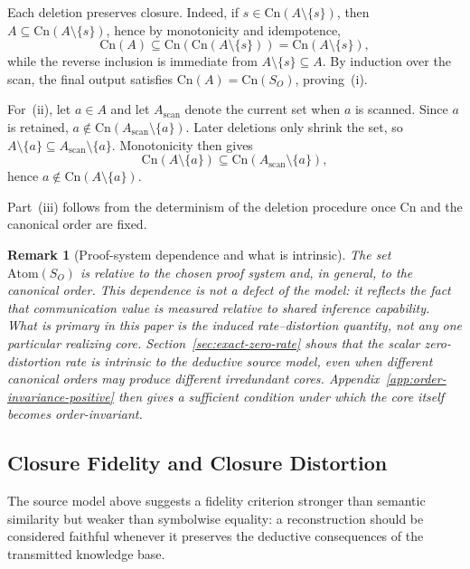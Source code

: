 \documentclass[journal,onecolumn]{IEEEtran}
\makeatletter
\newcommand{\Atom}{\text{Atom}}
\newcommand{\Cn}{\text{Cn}}
\newtheorem{remark}{Remark}[section]
\numberwithin{equation}{section}
\renewenvironment{proof}[1][\proofname]{\par
  \pushQED{\qed}%
  \normalfont \topsep6\p@\@plus6\p@\relax
  \trivlist
  \item[\hskip\labelsep
        \itshape
    #1\@addpunct{.}]\ignorespaces
}{%
  \popQED\endtrivlist\@endpefalse
}
\makeatother
\begin{document}
\begin{proof}
Each deletion preserves closure.
Indeed, if \(s\in\Cn(A\setminus\{s\})\), then
\(A\subseteq\Cn(A\setminus\{s\})\), hence by monotonicity and
idempotence,
\[
  \Cn(A)\subseteq\Cn(\Cn(A\setminus\{s\}))
  =\Cn(A\setminus\{s\}),
\]
while the reverse inclusion is immediate from
\(A\setminus\{s\}\subseteq A\).
By induction over the scan, the final output satisfies
\(\Cn(A)=\Cn(S_O)\), proving~\textup{(i)}.

For~\textup{(ii)}, let \(a\in A\) and let
\(A_{\mathrm{scan}}\) denote the current set when \(a\) is scanned.
Since \(a\) is retained,
\(a\notin\Cn(A_{\mathrm{scan}}\setminus\{a\})\).
Later deletions only shrink the set, so
\(A\setminus\{a\}\subseteq A_{\mathrm{scan}}\setminus\{a\}\).
Monotonicity then gives
\[
  \Cn(A\setminus\{a\})
  \subseteq
  \Cn(A_{\mathrm{scan}}\setminus\{a\}),
\]
hence \(a\notin\Cn(A\setminus\{a\})\).

Part~\textup{(iii)} follows from the determinism of the deletion
procedure once \(\Cn\) and the canonical order are fixed.
\end{proof}

\begin{remark}[Proof-system dependence and what is intrinsic]
\label{rem:ps-dependence}
The set \(\Atom(S_O)\) is relative to the chosen proof system and, in
general, to the canonical order.
This dependence is not a defect of the model: it reflects the fact
that communication value is measured relative to shared inference
capability.
What is primary in this paper is the induced
rate--distortion quantity, not any one particular realizing core.
Section~\ref{sec:exact-zero-rate} shows that the scalar
zero-distortion rate is intrinsic to the deductive source model, even
when different canonical orders may produce different irredundant
cores.
Appendix~\ref{app:order-invariance-positive} then gives a sufficient
condition under which the core itself becomes order-invariant.
\end{remark}

\subsection{Closure Fidelity and Closure Distortion}
\label{subsec:closure-fidelity}

The source model above suggests a fidelity criterion stronger than
semantic similarity but weaker than symbolwise equality:
a reconstruction should be considered faithful whenever it
preserves the deductive consequences of the transmitted knowledge
base.
\end{document}
